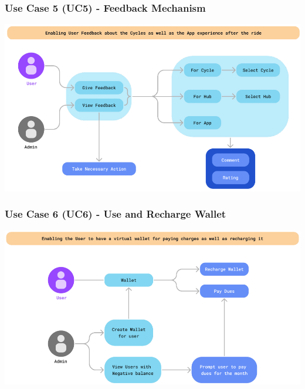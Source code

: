 \documentclass[11pt]{article}
\begin{document}
\subsubsection{Use Case 5 (UC5) - Feedback Mechanism}
\begin{center}
  \includegraphics[scale=0.5]{../srs/usecase-5.png}
\end{center}

\subsubsection{Use Case 6 (UC6) - Use and Recharge Wallet}
\begin{center}
  \includegraphics[scale=0.5]{../srs/usecase-6.png}
\end{center}
\end{document}
